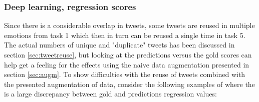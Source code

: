 \subsubsection{Deep learning, regression scores}
Since there is a considerable overlap in tweets, some tweets are reused in multiple emotions from task 1 which then in turn can be reused a single time in task 5. The actual numbers of unique and "duplicate" tweets has been discussed in section \ref{sec:tweetreuse}, but looking at the predictions versus the gold scores can help get a feeling for the effects using the naive data augmentation presented in section \ref{sec:augm}. To show difficulties with the reuse of tweets combined with the presented augmentation of data, consider the following examples of where the is a large discrepancy between gold and predictions regression values:\\
